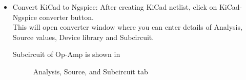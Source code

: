 \begin{itemize}
\item Convert KiCad to Ngspice:
After creating KiCad netlist, click on KiCad-Ngspice converter button.\\

This will open converter window where you can enter details of Analysis, Source values, Device library and Subcircuit.

Subcircuit of Op-Amp is shown in 
    \begin{figure}[!htp]
        \centering
         \hfill
         \vfill
        \hfill
        \caption{Analysis, Source, and Subcircuit tab}
    \end{figure}


\end{itemize}
